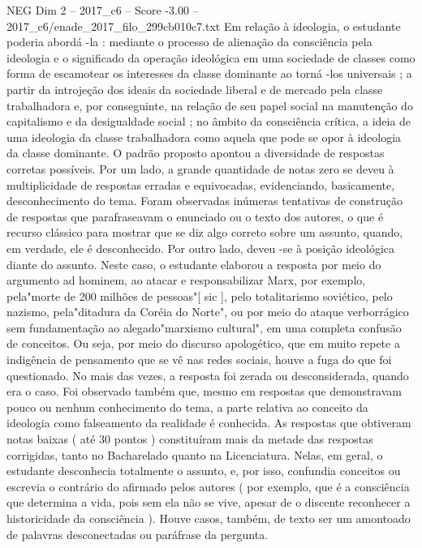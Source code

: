 \begin{textsample}{NEG Dim 2 – 2017\_c6 – Score -3.00 – 2017\_c6/enade\_2017\_filo\_299cb010c7.txt}
Em relação à ideologia, o estudante poderia abordá -la : mediante o processo de alienação da consciência pela ideologia e o significado da operação ideológica em uma sociedade de classes como forma de escamotear os interesses da classe dominante ao torná -los universais ; a partir da introjeção dos ideais da sociedade liberal e de mercado pela classe trabalhadora e, por conseguinte, na relação de seu papel social na manutenção do capitalismo e da desigualdade social ; no âmbito da consciência crítica, a ideia de uma ideologia da classe trabalhadora como aquela que pode se opor à ideologia da classe dominante.
O padrão proposto apontou a diversidade de respostas corretas possíveis.
Por um lado, a grande quantidade de notas zero se deveu à multiplicidade de respostas erradas e equivocadas, evidenciando, basicamente, desconhecimento do tema.
Foram observadas inúmeras tentativas de construção de respostas que parafraseavam o enunciado ou o texto dos autores, o que é recurso clássico para mostrar que se diz algo correto sobre um assunto, quando, em verdade, ele é desconhecido.
Por outro lado, deveu -se à posição ideológica diante do assunto.
Neste caso, o estudante elaborou a resposta por meio do argumento ad hominem, ao atacar e responsabilizar Marx, por exemplo, pela"morte de 200 milhões de pessoas"[ sic ], pelo totalitarismo soviético, pelo nazismo, pela"ditadura da Coréia do Norte", ou por meio do ataque verborrágico sem fundamentação ao alegado"marxismo cultural", em uma completa confusão de conceitos.
Ou seja, por meio do discurso apologético, que em muito repete a indigência de pensamento que se vê nas redes sociais, houve a fuga do que foi questionado.
No mais das vezes, a resposta foi zerada ou desconsiderada, quando era o caso.
Foi observado também que, mesmo em respostas que demonstravam pouco ou nenhum conhecimento do tema, a parte relativa ao conceito da ideologia como falseamento da realidade é conhecida.
As respostas que obtiveram notas baixas ( até 30 pontos ) constituíram mais da metade das respostas corrigidas, tanto no Bacharelado quanto na Licenciatura.
Nelas, em geral, o estudante desconhecia totalmente o assunto, e, por isso, confundia conceitos ou escrevia o contrário do afirmado pelos autores ( por exemplo, que é a consciência que determina a vida, pois sem ela não se vive, apesar de o discente reconhecer a historicidade da consciência ).
Houve casos, também, de texto ser um amontoado de palavras desconectadas ou paráfrase da pergunta.

\end{textsample}
